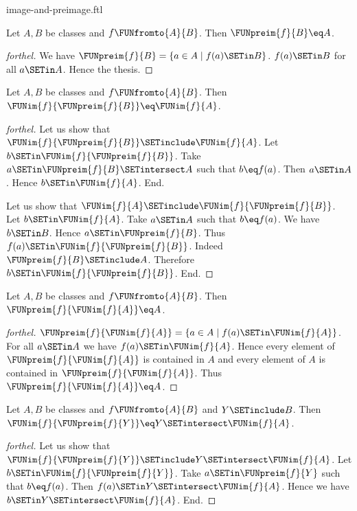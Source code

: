 \documentclass{naproche-library}
\begin{document}
\begin{smodule}[title=Computation Laws for Images and Preimages]{image-and-preimage.ftl}
\begin{proposition}[forthel,id=FOUNDATIONS_07_6541963008409600]
  Let $A, B$ be classes and $f \FUNfromto{A}{B}$.
  Then $\FUNpreim{f}{B} \eq A$.
\end{proposition}
\begin{proof}[forthel]
  We have $\FUNpreim{f}{B} = \{ a \in A \mid f(a) \SETin B \}$.
  $f(a) \SETin B$ for all $a \SETin A$.
  Hence the thesis.
\end{proof}

\begin{proposition}[forthel,id=FOUNDATIONS_07_1913313581596672]
  Let $A, B$ be classes and $f \FUNfromto{A}{B}$.
  Then $\FUNim{f}{\FUNpreim{f}{B}} \eq \FUNim{f}{A}$.
\end{proposition}
\begin{proof}[forthel]
  Let us show that $\FUNim{f}{\FUNpreim{f}{B}} \SETinclude \FUNim{f}{A}$.
    Let $b \SETin \FUNim{f}{\FUNpreim{f}{B}}$.
    Take $a \SETin \FUNpreim{f}{B} \SETintersect A$ such that $b \eq f(a)$.
    Then $a \SETin A$.
    Hence $b \SETin \FUNim{f}{A}$.
  End.

  Let us show that $\FUNim{f}{A} \SETinclude \FUNim{f}{\FUNpreim{f}{B}}$.
    Let $b \SETin \FUNim{f}{A}$.
    Take $a \SETin A$ such that $b \eq f(a)$.
    We have $b \SETin B$.
    Hence $a \SETin \FUNpreim{f}{B}$.
    Thus $f(a) \SETin \FUNim{f}{\FUNpreim{f}{B}}$.
    Indeed $\FUNpreim{f}{B} \SETinclude A$.
    Therefore $b \SETin \FUNim{f}{\FUNpreim{f}{B}}$.
  End.
\end{proof}

\begin{proposition}[forthel,id=FOUNDATIONS_07_3819758101200896]
  Let $A, B$ be classes and $f \FUNfromto{A}{B}$.
  Then $\FUNpreim{f}{\FUNim{f}{A}} \eq A$.
\end{proposition}
\begin{proof}[forthel]
  $\FUNpreim{f}{\FUNim{f}{A}} = \{ a \in A \mid f(a) \SETin \FUNim{f}{A} \}$.
  For all $a \SETin A$ we have $f(a) \SETin \FUNim{f}{A}$.
  Hence every element of $\FUNpreim{f}{\FUNim{f}{A}}$ is contained in $A$ and every element of $A$ is contained in $\FUNpreim{f}{\FUNim{f}{A}}$.
  Thus $\FUNpreim{f}{\FUNim{f}{A}} \eq A$.
\end{proof}

\begin{proposition}[forthel,id=FOUNDATIONS_07_7760514696347648]
  Let $A, B$ be classes and $f \FUNfromto{A}{B}$ and $Y \SETinclude B$.
  Then $\FUNim{f}{\FUNpreim{f}{Y}} \eq Y \SETintersect \FUNim{f}{A}$.
\end{proposition}
\begin{proof}[forthel]
  Let us show that $\FUNim{f}{\FUNpreim{f}{Y}} \SETinclude Y \SETintersect \FUNim{f}{A}$.
    Let $b \SETin \FUNim{f}{\FUNpreim{f}{Y}}$.
    Take $a \SETin \FUNpreim{f}{Y}$ such that $b \eq f(a)$.
    Then $f(a) \SETin Y \SETintersect \FUNim{f}{A}$.
    Hence we have $b \SETin Y \SETintersect \FUNim{f}{A}$.
  End.


\end{proof}
\end{smodule}
\end{document}

